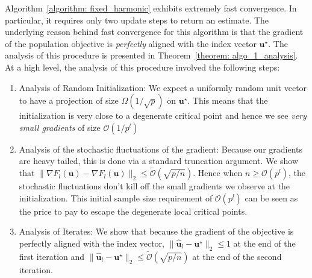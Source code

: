\documentclass[final,12pt]{colt2018} %
\renewcommand\v[1]{{\ensuremath{\boldsymbol{#1}}}}
\newcommand{\bigoh}[1]{\mathcal{O}\left( #1 \right)}
\begin{document}
Algorithm~\ref{algorithm: fixed_harmonic} exhibits extremely fast convergence. In particular, it requires only two update steps to return an estimate. The underlying reason behind fast convergence for this algorithm is that the gradient of the population objective is \emph{perfectly} aligned with the index vector $\v u^\star$. The analysis of this procedure is presented in Theorem~\ref{theorem: algo_1_analysis}. At a high level, the analysis of this procedure involved the following steps: 
\begin{enumerate}
    \item Analysis of Random Initialization: We expect a uniformly random unit vector to have a projection of size $\Omega( 1/\sqrt{p})$ on $\v u^\star$. This means that the initialization is very close to a degenerate critical point and hence we see \emph{very small gradients} of size $\bigoh{1/p^l}$
    \item Analysis of the stochastic fluctuations of the gradient: Because our gradients are heavy tailed, this is done via a standard truncation argument. We show that $\| \nabla F_l(\v u) - \nabla \hat{F}_l(\v u)\|_2 \leq \tilde{\mathcal{O}}( \sqrt{p/n} )$. Hence when $n \geq \mathcal{O}({p^l})$, the stochastic fluctuations don't kill off the small gradients we observe at the initialization. This initial sample size requirement of $\bigoh{p^l}$ can be seen as the price to pay to escape the degenerate local critical points. 
    \item Analysis of Iterates: We show that because the gradient of the objective is perfectly aligned with the index vector, $\| \hat{\v u}_l - \v u^\star \|_2 \leq 1$ at the end of the first iteration and $\| \hat{\v u}_l - \v u^\star \|_2 \leq \tilde{\mathcal{O}}( \sqrt{p/n})$ at the end of the second iteration. 
\end{enumerate}
\end{document}
